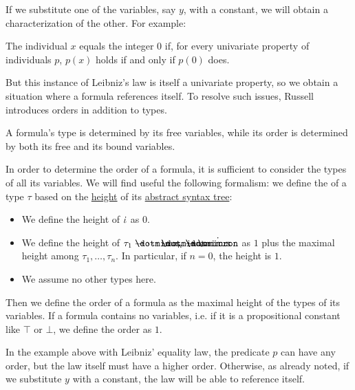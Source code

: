 \begin{concept}
\begin{thmenum}
    If we substitute one of the variables, say \( y \), with a constant, we will obtain a characterization of the other. For example:
    \begin{displayquote}
      The individual \( x \) equals the integer \( 0 \) if, for every univariate property of individuals \( p \), \( p(x) \) holds if and only if \( p(0) \) does.
    \end{displayquote}

    But this instance of Leibniz's law is itself a univariate property, so we obtain a situation where a formula references itself. To resolve such issues, Russell introduces orders in addition to types.

     A formula's type is determined by its free variables, while its order is determined by both its free and its bound variables.

    In order to determine the order of a formula, it is sufficient to consider the types of all its variables. We will find useful the following formalism: we define the  of a type \( \tau \) based on the \hyperref[def:rooted_tree/height]{height} of its \hyperref[def:simple_type_ast]{abstract syntax tree}:
    \begin{itemize}
      \item We define the height of \( \dot{\iota} \) as \( 0 \).
      \item We define the height of \( \tau_1 \synimplies \cdots \synimplies \tau_n \synimplies \syn\omicron \) as \( 1 \) plus the maximal height among \( \tau_1, \ldots, \tau_n \). In particular, if \( n = 0 \), the height is \( 1 \).
      \item We assume no other types here.
    \end{itemize}

    Then we define the order of a formula as the maximal height of the types of its variables. If a formula contains no variables, i.e. if it is a propositional constant like \( \top \) or \( \bot \), we define the order as \( 1 \).

    In the example above with Leibniz' equality law, the predicate \( p \) can have any order, but the law itself must have a higher order. Otherwise, as already noted, if we substitute \( y \) with a constant, the law will be able to reference itself.


\end{thmenum}
\end{concept}
